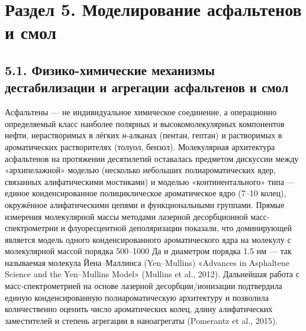 \documentclass[11pt]{extarticle}
\begin{document}
\newpage

\section{Раздел 5. Моделирование асфальтенов и смол}\label{ux440ux430ux437ux434ux435ux43b-5.-ux43cux43eux434ux435ux43bux438ux440ux43eux432ux430ux43dux438ux435-ux430ux441ux444ux430ux43bux44cux442ux435ux43dux43eux432-ux438-ux441ux43cux43eux43b}

\subsection{5.1. Физико-химические механизмы дестабилизации и агрегации асфальтенов и смол}\label{ux444ux438ux437ux438ux43aux43e-ux445ux438ux43cux438ux447ux435ux441ux43aux438ux435-ux43cux435ux445ux430ux43dux438ux437ux43cux44b-ux434ux435ux441ux442ux430ux431ux438ux43bux438ux437ux430ux446ux438ux438-ux438-ux430ux433ux440ux435ux433ux430ux446ux438ux438-ux430ux441ux444ux430ux43bux44cux442ux435ux43dux43eux432-ux438-ux441ux43cux43eux43b}

Асфальтены --- не индивидуальное химическое соединение, а операционно определяемый класс наиболее полярных и высокомолекулярных компонентов нефти, нерастворимых в лёгких \emph{н}-алканах (пентан, гептан) и растворимых в ароматических растворителях (толуол, бензол). Молекулярная архитектура асфальтенов на протяжении десятилетий оставалась предметом дискуссии между «архипелажной» моделью (несколько небольших полиароматических ядер, связанных алифатическими мостиками) и моделью «континентального» типа --- единое конденсированное полициклическое ароматическое ядро (7--10 колец), окружённое алифатическими цепями и функциональными группами. Прямые измерения молекулярной массы методами лазерной десорбционной масс-спектрометрии и флуоресцентной деполяризации показали, что доминирующей является модель одного конденсированного ароматического ядра на молекулу с молекулярной массой порядка 500--1000 Да и диаметром порядка 1.5 нм --- так называемая молекула Йена--Маллинса (Yen--Mullins) «Advances in Asphaltene Science and the Yen--Mullins Model» (Mullins et al., 2012). Дальнейшая работа с масс-спектрометрией на основе лазерной десорбции/ионизации подтвердила единую конденсированную полиароматическую архитектуру и позволила количественно оценить число ароматических колец, длину алифатических заместителей и степень агрегации в наноагрегаты (Pomerantz et al., 2015).
\end{document}
